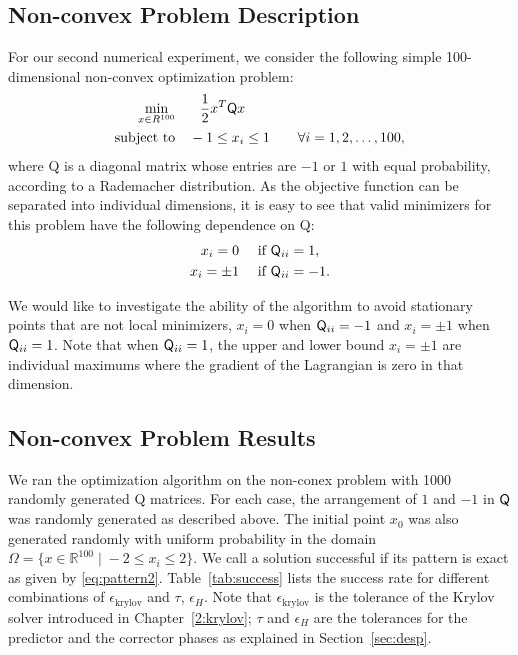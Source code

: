 \subsection{Non-convex Problem Description}
For our second numerical experiment, we consider the following simple 100-dimensional non-convex optimization problem:
\begin{equation*}
\begin{aligned}
\underset{x \in R^{100}} {\text{min}}  
 &\quad \phantom{-} \frac{1}{2}x^T \mathsf{Q} x \\
   {\text{subject to}}
 &\quad -1 \leq x_i \leq 1 \qquad \forall i = 1,2,\ldots,100, \\
\end{aligned}
\end{equation*}
where Q is a diagonal matrix whose entries are $-1$ or $1$ with equal probability, 
 \ie according to a Rademacher distribution. 
 As the objective function can be separated into 
individual dimensions, it is easy to see that 
valid minimizers for this problem have the following dependence on Q:
\begin{equation}\label{eq:pattern2}
  \begin{gathered}
  x_i=0  \quad  \text{~if~}  \mathsf{Q}_{ii} = 1,  \\
  x_i = \pm 1 \quad  \text{~if~}  \mathsf{Q}_{ii} = -1.
  \end{gathered}
\end{equation}

We would like to investigate
the ability of the algorithm to avoid stationary points that are not local minimizers, 
\eg $x_i = 0$ 
when $\mathsf{Q}_{ii} = -1$ and $x_i = \pm 1$ when $\mathsf{Q}_{ii} = 1$.
Note that when $\mathsf{Q}_{ii} = 1$, the upper and lower bound $x_i = \pm 1$ are 
individual maximums where the gradient of the Lagrangian is zero in that dimension. 

\subsection{Non-convex Problem Results}
We ran the optimization algorithm on the non-conex problem with 1000 randomly generated Q matrices.
For each case, 
the arrangement of $1$ and $-1$ in $\mathsf{Q}$ was randomly generated as described above. 
 The initial point $x_0$ was also generated randomly with uniform probability in the domain
  $\Omega = \{ x \in \mathbb{R}^{100} \; | \; -2 \leq x_i \leq 2 \}$.  We call a solution successful if 
  its pattern is exact as given by \eqref{eq:pattern2}.  Table~\ref{tab:success} lists the success rate for different 
  combinations of $\epsilon_{\text{krylov}}$ and $\tau$, $\epsilon_H$. 
Note that $\epsilon_{\text{krylov}}$ is the tolerance of the Krylov solver introduced in Chapter~\ref{2:krylov}; 
$\tau$ and $\epsilon_H$ are the tolerances for the predictor and the corrector phases as explained in Section~\ref{sec:desp}. 
 
